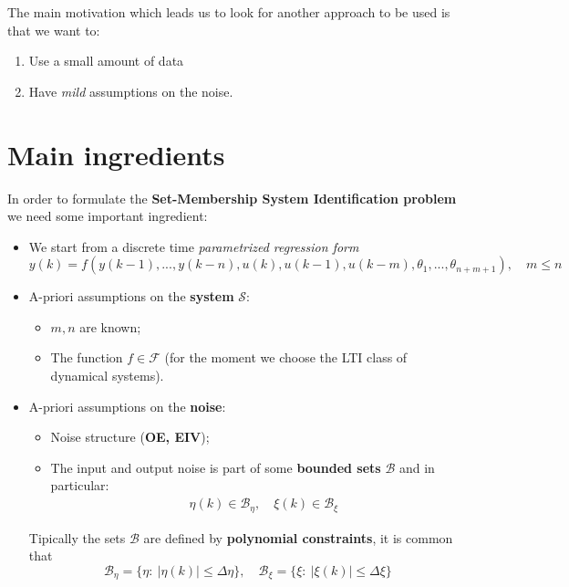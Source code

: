 The main motivation which leads us to look for another approach to be used is that we want to:
\begin{enumerate}
    \itemsep0em
    \item Use a small amount of data
    \item Have \textit{mild} assumptions on the noise.
\end{enumerate}

\section{Main ingredients}
In order to formulate the \textbf{Set-Membership System Identification problem} we need some important ingredient:
\begin{itemize}
    \itemsep0em
    \item We start from a discrete time \textit{parametrized regression form} 
    \begin{equation*}
        y(k) = f(y(k-1),...,y(k-n), u(k), u(k-1), u(k-m), \theta_1, ..., \theta_{n+m+1}), \quad m \le n
    \end{equation*}
    \item A-priori assumptions on the \textbf{system} $\mathcal{S}$:
    \begin{itemize}
        \item $m,n$ are known; 
        \item The function $f\in\mathcal{F}$ (for the moment we choose the LTI class of dynamical systems).
    \end{itemize}
    \item A-priori assumptions on the \textbf{noise}:
    \begin{itemize}
        \item Noise structure (\textbf{OE, EIV}); 
        \item The input and output noise is part of some \textbf{bounded sets} $\mathcal{B}$ and in particular:
        {\large{
            \begin{align*}
                &\eta(k)\in\mathcal{B}_\eta, \quad
                \xi(k) \in \mathcal{B}_\xi
            \end{align*}
        }}
    \end{itemize}
    Tipically the sets $\mathcal{B}$ are defined by \textbf{polynomial constraints}, it is common that
    {\large{
        \begin{equation*}
            \mathcal{B}_\eta = \{
                \eta: \ \vert \eta(k) \vert \le \Delta\eta
            \}, \quad
            \mathcal{B}_\xi = \{
                \xi : \ \vert \xi(k) \vert \le \Delta\xi
            \}
        \end{equation*}
    }}
\end{itemize}


